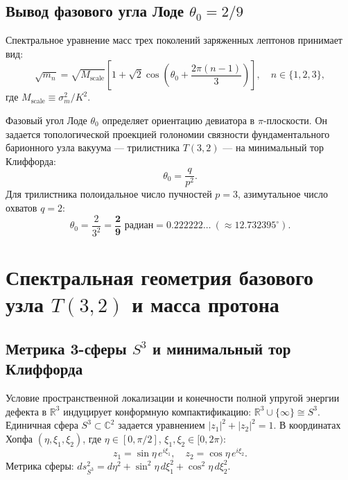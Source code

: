 \documentclass[12pt,a4paper]{article}
\begin{document}
	\subsection{Вывод фазового угла Лоде $\theta_0 = 2/9$}
	Спектральное уравнение масс трех поколений заряженных лептонов принимает вид:
	\begin{equation}
		\sqrt{m_n} = \sqrt{M_{\text{scale}}} \left[ 1 + \sqrt{2} \cos\left( \theta_0 + \frac{2\pi(n-1)}{3} \right) \right], \quad n \in \{1, 2, 3\},
	\end{equation}
	где $M_{\text{scale}} \equiv \sigma_m^2 / K^2$.
	
	Фазовый угол Лоде $\theta_0$ определяет ориентацию девиатора в $\pi$-плоскости. Он задается топологической проекцией голономии связности фундаментального барионного узла вакуума --- трилистника $T(3,2)$ --- на минимальный тор Клиффорда:
	\begin{equation}
		\theta_0 = \frac{q}{p^2}.
	\end{equation}
	Для трилистника полоидальное число пучностей $p=3$, азимутальное число охватов $q=2$:
	\begin{equation}
		\theta_0 = \frac{2}{3^2} = \mathbf{\frac{2}{9} \text{ радиан}} = 0.222222\dots \ (\approx 12.732395^\circ).
	\end{equation}
	
	\section{Спектральная геометрия базового узла $T(3,2)$ и масса протона}
	
	\subsection{Метрика 3-сферы $S^3$ и минимальный тор Клиффорда}
	Условие пространственной локализации и конечности полной упругой энергии дефекта в $\mathbb{R}^3$ индуцирует конформную компактификацию: $\mathbb{R}^3 \cup \{\infty\} \cong S^3$. Единичная сфера $S^3 \subset \mathbb{C}^2$ задается уравнением $|z_1|^2 + |z_2|^2 = 1$. В координатах Хопфа $(\eta, \xi_1, \xi_2)$, где $\eta \in [0, \pi/2]$, $\xi_1, \xi_2 \in [0, 2\pi)$:
	\begin{equation}
		z_1 = \sin\eta \, e^{i\xi_1}, \quad z_2 = \cos\eta \, e^{i\xi_2}.
	\end{equation}
	Метрика сферы: $ds^2_{S^3} = d\eta^2 + \sin^2\eta \, d\xi_1^2 + \cos^2\eta \, d\xi_2^2$.
	
\end{document}
